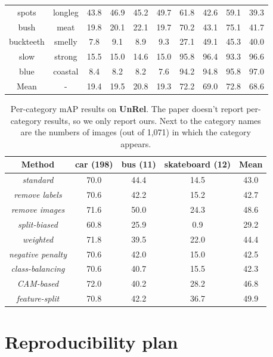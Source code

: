 \begin{table}[h]
{\begin{tabular}{|cc|cc|cc|cc|cc|}
spots     & longleg   & 43.8 & 46.9 & 45.2 & 49.7 & 61.8 & 42.6 & 59.1 & 39.3 \\ 
bush      & meat      & 19.8 & 20.1 & 22.1 & 19.7 & 70.2 & 43.1 & 75.1 & 41.7 \\ 
buckteeth & smelly    & 7.8  &  9.1 & 8.9  & 9.3  & 27.1 & 49.1 & 45.3 & 40.0 \\ 
slow      & strong    & 15.5 & 15.0 & 14.6 & 15.0 & 95.8 & 96.4 & 93.3 & 96.6 \\ 
blue      & coastal   & 8.4  &  8.2 & 8.2  & 7.6 & 94.2 & 94.8 & 95.8 & 97.0 \\ 
\hline
 Mean & - & 19.4 & 19.5 & 20.8 & 19.3 & 72.2 & 69.0 & 72.8 & 68.6 \\ 
\hline
\end{tabular}
}
\end{table}

\setlength{\floatsep}{12.0pt}

\begin{table}[h!]
\centering
\caption{Per-category mAP results on \textbf{UnRel}. The paper doesn't report per-category results, so we only report ours. Next to the category names are the numbers of images (out of 1,071) in which the category appears.}
\label{tab:unrel-results}
\begin{tabular}{|c|ccc|c|}
\hline
Method & car (198) & bus (11) & skateboard (12) & Mean \\
\hline
\textit{standard}         & 70.0 & 44.4 & 14.5 & 43.0 \\
\hline
\textit{remove labels}    & 70.6 & 42.2 & 15.2 & 42.7 \\
\textit{remove images}    & 71.6 & 50.0 & 24.3 & 48.6 \\
\textit{split-biased}     & 60.8 & 25.9 & 0.9  & 29.2 \\
\textit{weighted}         & 71.8 & 39.5 & 22.0 & 44.4 \\
\textit{negative penalty} & 70.6 & 42.0 & 15.0 & 42.5 \\
\textit{class-balancing}  & 70.6 & 40.7 & 15.5 & 42.3 \\
\hline
\textit{CAM-based}        & 72.0 & 40.2 & 28.2 & 46.8 \\
\textit{feature-split}    & 70.8 & 42.2 & 36.7 & 49.9 \\
\hline
\end{tabular}
\end{table}


\clearpage
\section{Reproducibility plan}
\label{sec:reproducibilityplan}

